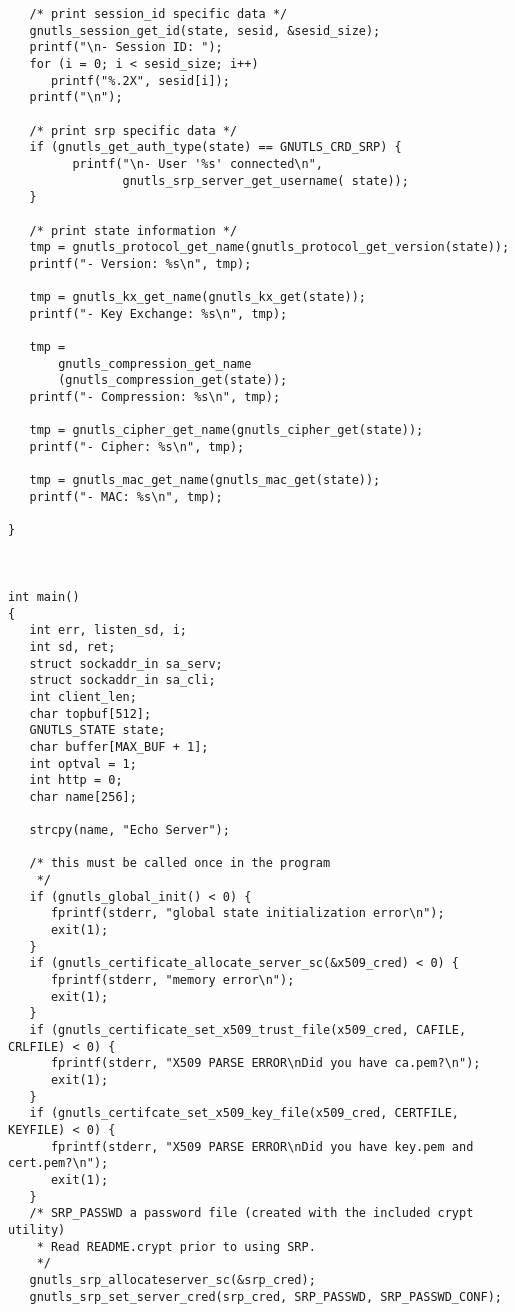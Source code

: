 \begin{verbatim}
   /* print session_id specific data */
   gnutls_session_get_id(state, sesid, &sesid_size);
   printf("\n- Session ID: ");
   for (i = 0; i < sesid_size; i++)
      printf("%.2X", sesid[i]);
   printf("\n");

   /* print srp specific data */
   if (gnutls_get_auth_type(state) == GNUTLS_CRD_SRP) {
         printf("\n- User '%s' connected\n",
                gnutls_srp_server_get_username( state));
   }

   /* print state information */
   tmp = gnutls_protocol_get_name(gnutls_protocol_get_version(state));
   printf("- Version: %s\n", tmp);

   tmp = gnutls_kx_get_name(gnutls_kx_get(state));
   printf("- Key Exchange: %s\n", tmp);

   tmp =
       gnutls_compression_get_name
       (gnutls_compression_get(state));
   printf("- Compression: %s\n", tmp);

   tmp = gnutls_cipher_get_name(gnutls_cipher_get(state));
   printf("- Cipher: %s\n", tmp);

   tmp = gnutls_mac_get_name(gnutls_mac_get(state));
   printf("- MAC: %s\n", tmp);

}



int main()
{
   int err, listen_sd, i;
   int sd, ret;
   struct sockaddr_in sa_serv;
   struct sockaddr_in sa_cli;
   int client_len;
   char topbuf[512];
   GNUTLS_STATE state;
   char buffer[MAX_BUF + 1];
   int optval = 1;
   int http = 0;
   char name[256];

   strcpy(name, "Echo Server");

   /* this must be called once in the program
    */
   if (gnutls_global_init() < 0) {
      fprintf(stderr, "global state initialization error\n");
      exit(1);
   }
   if (gnutls_certificate_allocate_server_sc(&x509_cred) < 0) {
      fprintf(stderr, "memory error\n");
      exit(1);
   }
   if (gnutls_certificate_set_x509_trust_file(x509_cred, CAFILE, CRLFILE) < 0) {
      fprintf(stderr, "X509 PARSE ERROR\nDid you have ca.pem?\n");
      exit(1);
   }
   if (gnutls_certifcate_set_x509_key_file(x509_cred, CERTFILE, KEYFILE) < 0) {
      fprintf(stderr, "X509 PARSE ERROR\nDid you have key.pem and cert.pem?\n");
      exit(1);
   }
   /* SRP_PASSWD a password file (created with the included crypt utility) 
    * Read README.crypt prior to using SRP.
    */
   gnutls_srp_allocateserver_sc(&srp_cred);
   gnutls_srp_set_server_cred(srp_cred, SRP_PASSWD, SRP_PASSWD_CONF);



\end{verbatim}

